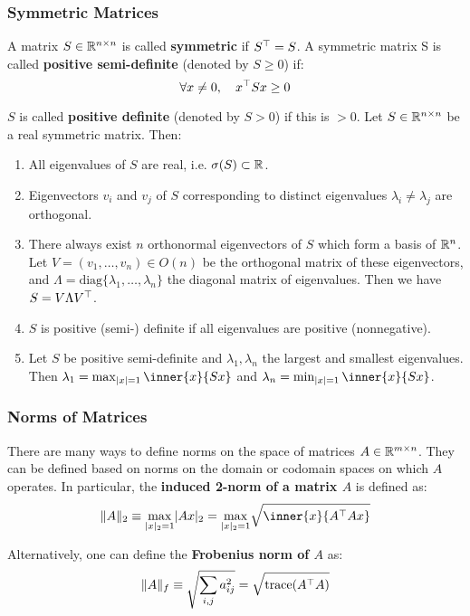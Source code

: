 \subsubsection{Symmetric Matrices}
\label{ssub:symmetric_matrices}

A matrix $S \in \mathbb{R}^{n \times n}$ is called \textbf{symmetric} if $S^{\top} = S$.
A symmetric matrix S is called \textbf{positive semi-definite}
(denoted by $S \ge 0$) if:
	\[\forall x \ne 0, \quad x^{\top}Sx \ge 0\]

\noindent
$S$ is called \textbf{positive definite} (denoted by $S>0$) if this is $>0$.
Let $S \in \mathbb{R}^{n \times n}$ be a real symmetric matrix. Then:
\begin{enumerate}
	\item All eigenvalues of $S$ are real, i.e. $\sigma(S) \subset \mathbb{R}$.
	\item Eigenvectors $v_i$ and $v_j$ of $S$ corresponding to distinct
		eigenvalues $\lambda_i \ne \lambda_j$ are orthogonal.
	\item There always exist $n$ orthonormal eigenvectors of $S$
		which form a basis of $\mathbb{R}^n$.
		Let $V = (v_1, \ldots, v_n) \in O(n)$ be the orthogonal matrix
		of these eigenvectors, and
		$\Lambda = \text{diag}\{\lambda_1, \ldots, \lambda_n\}$ the diagonal
		matrix of eigenvalues. Then we have $S = V \Lambda V^{\top}$.
	\item $S$ is positive (semi-) definite if all eigenvalues are
		positive (nonnegative).
	\item Let $S$ be positive semi-definite and $\lambda_1, \lambda_n$ the largest
		and smallest eigenvalues. Then $\lambda_1 = \max_{|x|=1} \inner{x}{Sx}$
		and $\lambda_n = \min_{|x|=1} \inner{x}{Sx}$.
	
\end{enumerate}


\subsubsection{Norms of Matrices}
\label{ssub:norms_of_matrices}

There are many ways to define norms on the space of matrices $A \in \mathbb{R}^{m \times{} n}$.
They can be defined based on norms on the domain or codomain spaces
on which $A$ operates. In particular, the
\textbf{induced 2-norm of a matrix $A$} is defined as:
	\[\|A\|_2 \equiv \underset{|x|_2=1}{\max} |Ax|_2
	= \underset{|x|_2=1}{\max} \sqrt{\inner{x}{\tr{A}Ax}}\]

\noindent
Alternatively, one can define the \textbf{Frobenius norm of $A$} as:
	\[\|A\|_f \equiv \sqrt{\sum_{i,j}a^2_{ij}}
	= \sqrt{\text{trace}(A^{\top}A)}\]

